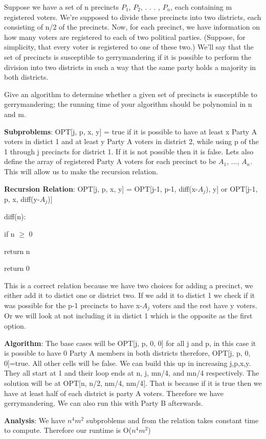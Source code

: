 \documentclass{article}
\begin{document}
Suppose we have a set of n precincts $P_{1}$, $P_{2}$, . . . , $P_{n}$,
each containing m registered voters. We’re supposed to divide these
precincts into two districts, each consisting of n/2 of the precincts.
Now, for each precinct, we have information on how many voters are
registered to each of two political parties. (Suppose, for simplicity,
that every voter is registered to one of these two.) We’ll say that the
set of precincts is susceptible to gerrymandering if it is possible to
perform the division into two districts in such a way that the same party
holds a majority in both districts.

Give an algorithm to determine whether a given set of precincts is
susceptible to gerrymandering; the running time of your algorithm should
be polynomial in n and m. \newline

\textbf{Subproblems}: OPT[j, p, x, y] = true if it is possible to have
at least x Party A voters in distict 1 and at least y Party A voters in
district 2, while using p of the 1 through j precincts for district 1.
If it is not possible then it is false.  Lets also define the array of
registered Party A voters for each precinct to be $A_{1}$, ...,
$A_{n}$.  This will allow us to make the recursion relation. \newline

\textbf{Recursion Relation}: OPT[j, p, x, y] = OPT[j-1, p-1, diff(x-$A_{j}$), y]
 or OPT[j-1, p, x, diff(y-$A_{j}$)]

 \indent \indent diff(n):

  \indent \indent \indent  if n $\geq$ 0

  \indent \indent \indent \indent  return n

  \indent \indent  return 0

 This is a correct relation because we have two choices for adding a precinct,
 we either add it to distict one or district two.  If we add it to distict 1
 we check if it was possible for the p-1 precincts to have x-$A_{j}$
 voters and the rest have y voters.  Or we will look at not including it in
 distict 1 which is the opposite as the first option. \newline

\textbf{Algorithm}: The base cases will be OPT[j, p, 0, 0] for all j and p,
in this case it is possible to have 0 Party A members in both districts
therefore, OPT[j, p, 0, 0]=true.  All other cells will be false.
We can build this up in increasing j,p,x,y.  They all start at 1 and their
loop ends at n, j, mn/4, and mn/4 respectively. The solution will be at
OPT[n, n/2, nm/4, nm/4].  That is because if it is true then we have at least
half of each district is party A voters. Therefore we have gerrymandering.
We can also run this with Party B afterwards. \newline


\textbf{Analysis}:  We have $n^4$$m^2$ subproblems and from the relation
takes constant time to compute.  Therefore our runtime is O($n^4$$m^2$)
\end{document}
